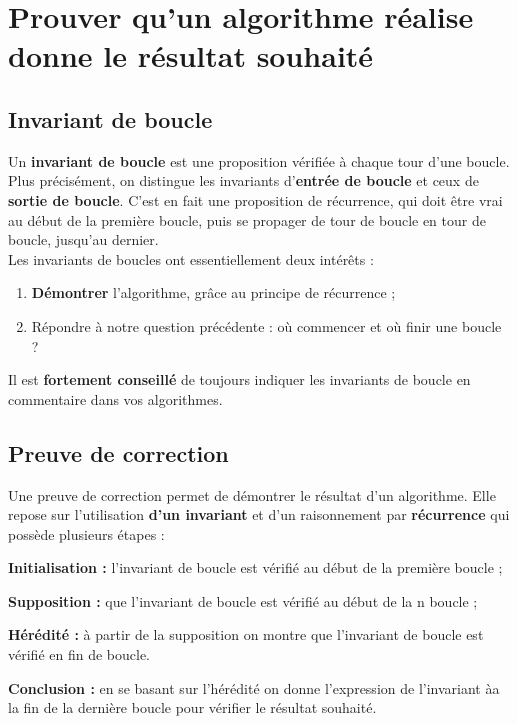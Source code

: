 \section{Prouver qu'un algorithme réalise donne le résultat souhaité}

\subsection{Invariant de boucle}

\begin{defi}
Un \textbf{invariant de boucle} est une proposition vérifiée à chaque tour d'une boucle. Plus 
précisément, on distingue les invariants d'\textbf{entrée de boucle} et ceux de \textbf{sortie de 
boucle}. C'est en fait une proposition de récurrence, qui doit être vrai au début de la première 
boucle, puis se propager de tour de boucle en tour de boucle, jusqu'au dernier.\\
Les invariants de boucles ont essentiellement deux intérêts :
\begin{enumerate}
 \item \textbf{Démontrer} l'algorithme, grâce au principe de récurrence ;
 \item Répondre à notre question précédente : où commencer et où finir une boucle ?
\end{enumerate}
\end{defi}

\begin{rem}
Il est \textbf{fortement conseillé} de toujours indiquer les invariants de boucle en commentaire 
dans vos algorithmes.\\ 
\end{rem}



\subsection{Preuve de correction}

\begin{defi}
Une preuve de correction permet de démontrer le résultat d'un algorithme. Elle repose sur l'utilisation \textbf{d'un invariant} et d'un raisonnement par \textbf{récurrence} qui possède plusieurs étapes : 
\item \textbf{Initialisation : } l'invariant de boucle est vérifié au début de la première boucle ;
\item \textbf{Supposition : } que l'invariant de boucle est vérifié au début de la n boucle ;
\item \textbf{Hérédité : } à partir de la supposition on montre que l'invariant de boucle est vérifié en fin de boucle.
\item \textbf{Conclusion : } en se basant sur l'hérédité on donne l'expression de l'invariant àa la fin de la dernière boucle pour vérifier le résultat souhaité.
\end{defi}

